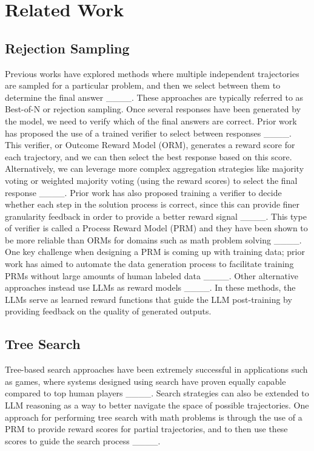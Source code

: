 \section{Related Work}
\subsection{Rejection Sampling}
Previous works have explored methods where multiple independent trajectories are sampled for a particular problem, and then we select between them to determine the final answer ____.
These approaches are typically referred to as Best-of-N or rejection sampling. 
Once several responses have been generated by the model, we need to verify which of the final answers are correct.  
Prior work has proposed the use of a trained verifier to select between responses ____.
This verifier, or Outcome Reward Model (ORM), generates a reward score for each trajectory, and we can then select the best response based on this score.
Alternatively, we can leverage more complex aggregation strategies like majority voting or weighted majority voting (using the reward scores) to select the final response ____.
Prior work has also proposed training a verifier to decide whether each step in the solution process is correct, since this can provide finer granularity feedback in order to provide a better reward signal ____. 
This type of verifier is called a Process Reward Model (PRM) and they have been shown to be more reliable than ORMs for domains such as math problem solving ____.
One key challenge when designing a PRM is coming up with training data; prior work has aimed to automate the data generation process to facilitate training PRMs without large amounts of human labeled data ____.
Other alternative approaches instead use LLMs as reward models ____. In these methods, the LLMs serve as learned reward functions that guide the LLM post-training by providing feedback on the quality of generated outputs.

\subsection{Tree Search}

Tree-based search approaches have been extremely successful in applications such as games, where systems designed using search have proven equally capable compared to top human players ____.
Search strategies can also be extended to LLM reasoning as a way to better navigate the space of possible trajectories.
One approach for performing tree search with math problems is through the use of a PRM to  provide reward scores for partial trajectories, and to then use these scores to guide the search process ____.

